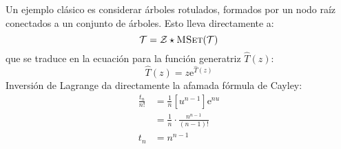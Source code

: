   Un ejemplo clásico es considerar árboles rotulados,
  formados por un nodo raíz conectados a un conjunto de árboles.%
  Esto lleva directamente a:
  \begin{equation*}
    \mathcal{T}
      = \mathcal{Z} \star \operatorname{\textsc{MSet}}(\mathcal{T})
  \end{equation*}
  que se traduce en la ecuación
  para la función generatriz \(\widehat{T}(z)\):
  \begin{equation*}
    \widehat{T}(z)
      = z \mathrm{e}^{\widehat{T}(z)}
  \end{equation*}
  Inversión de Lagrange%
  da directamente la afamada fórmula de Cayley:%
  \begin{align*}
    \frac{t_n}{n!}
      &= \frac{1}{n} \left[ u^{n - 1} \right] \mathrm{e}^{n u} \\
      &= \frac{1}{n} \cdot \frac{n^{n - 1}}{(n - 1)!} \\
     t_n
       &= n^{n - 1}
  \end{align*}

